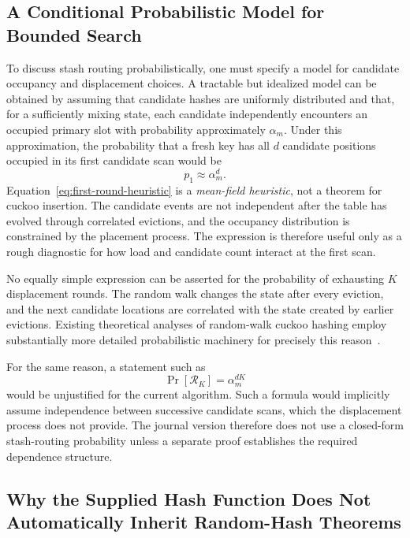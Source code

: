 \documentclass[conference]{IEEEtran}
\begin{document}
\subsection{A Conditional Probabilistic Model for Bounded Search}

To discuss stash routing probabilistically, one must specify a model for candidate occupancy and displacement choices. A tractable but idealized model can be obtained by assuming that candidate hashes are uniformly distributed and that, for a sufficiently mixing state, each candidate independently encounters an occupied primary slot with probability approximately $\alpha_m$. Under this approximation, the probability that a fresh key has all $d$ candidate positions occupied in its first candidate scan would be
\begin{equation}
    p_1\approx \alpha_m^d.
    \label{eq:first-round-heuristic}
\end{equation}
Equation~\eqref{eq:first-round-heuristic} is a \emph{mean-field heuristic}, not a theorem for cuckoo insertion. The candidate events are not independent after the table has evolved through correlated evictions, and the occupancy distribution is constrained by the placement process. The expression is therefore useful only as a rough diagnostic for how load and candidate count interact at the first scan.

No equally simple expression can be asserted for the probability of exhausting $K$ displacement rounds. The random walk changes the state after every eviction, and the next candidate locations are correlated with the state created by earlier evictions. Existing theoretical analyses of random-walk cuckoo hashing employ substantially more detailed probabilistic machinery for precisely this reason~\cite{fountoulakis2010insertion,walzer2022insertion,bell2024constant}.

For the same reason, a statement such as
\begin{equation}
    \Pr[\mathcal{R}_K] = \alpha_m^{dK}
\end{equation}
would be unjustified for the current algorithm. Such a formula would implicitly assume independence between successive candidate scans, which the displacement process does not provide. The journal version therefore does not use a closed-form stash-routing probability unless a separate proof establishes the required dependence structure.

\subsection{Why the Supplied Hash Function Does Not Automatically Inherit Random-Hash Theorems}
\end{document}
